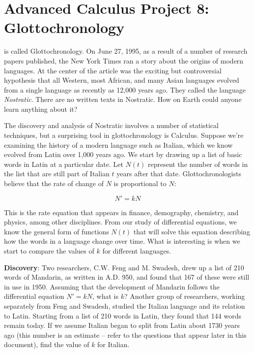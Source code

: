 \documentclass
[justified,nohyper]
{tufte-handout}
\begin{document}
\section{Advanced Calculus Project 8: Glottochronology}

 is called Glottochronology. On June 27, 1995, as a result of a number of research papers published, the New York Times ran a story about the origins of modern languages. At the center of the article was the exciting but controversial hypothesis that all Western, most African, and many Asian languages evolved from a single language as recently as 12,000 years ago. They called the language \textit{Nostratic}. There are no written texts in Nostratic. How on Earth could anyone learn anything about it?

The discovery and analysis of Nostratic involves a number of statistical techniques, but a surprising tool in glottochronology is Calculus. Suppose we're examining the history of a modern language such as Italian, which we know evolved from Latin over 1,000 years ago. We start by drawing up a list of basic words in Latin at a particular date. Let $N(t)$ represent the number of words in the list that are still part of Italian $t$ years after that date. Glottochronologists believe that the rate of change of $N$ is proportional to $N$:

\[
    N' = kN
\]

This is the rate equation that appears in finance, demography, chemistry, and physics, among other disciplines. From our study of differential equations, we know the general form of functions $N(t)$ that will solve this equation describing how the words in a language change over time. What is interesting is when we start to compare the values of $k$ for different languages.

\textbf{Discovery}: Two researchers, C.W. Feng and M. Swadesh, drew up a list of 210 words of Mandarin, as written in A.D. 950, and found that 167 of these were still in use in 1950. Assuming that the development of Mandarin follows the differential equation $N'=kN$, what is $k$? Another group of researchers, working separately from Feng and Swadesh, studied the Italian language and its relation to Latin. Starting from a list of 210 words in Latin, they found that 144 words remain today. If we assume Italian began to split from Latin about 1730 years ago (this number is an estimate -- refer to the questions that appear later in this document), find the value of $k$ for Italian.
\end{document}
